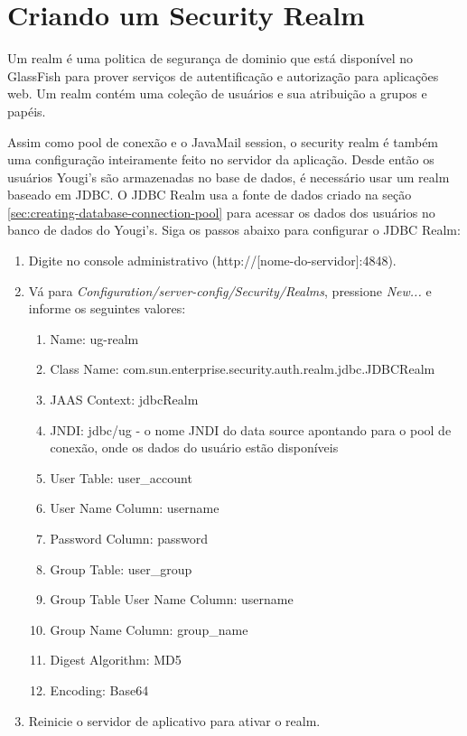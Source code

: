 \documentclass[envcountsame,envcountchap,letterpaper]{svmono}
\begin{document}
\section{Criando um Security Realm}

Um realm é uma politica de segurança de dominio que está disponível no GlassFish para prover serviços de autentificação e autorização para aplicações web. Um realm contém uma coleção de usuários e sua atribuição a grupos e papéis.

Assim como pool de conexão e o JavaMail session, o security realm é também uma configuração inteiramente feito no servidor da aplicação. Desde então os usuários Yougi's são armazenadas no base de dados, é necessário usar um realm baseado em JDBC. O JDBC Realm usa a fonte de dados criado na seção \ref{sec:creating-database-connection-pool} para acessar os dados dos usuários no banco de dados do Yougi's. Siga os passos abaixo para configurar o JDBC Realm:

\begin{enumerate}
\item Digite no console administrativo (http://[nome-do-servidor]:4848).
\item Vá para \textit{Configuration/server-config/Security/Realms}, pressione \textit{New...} e informe os seguintes valores:
   \begin{enumerate}
   \item Name: ug-realm
   \item Class Name: com.sun.enterprise.security.auth.realm.jdbc.JDBCRealm
   \item JAAS Context: jdbcRealm
   \item JNDI: jdbc/ug - o nome JNDI do data source apontando para o pool de conexão, onde os dados do usuário estão disponíveis
   \item User Table: user\_account
   \item User Name Column: username
   \item Password Column: password
   \item Group Table: user\_group
   \item Group Table User Name Column: username
   \item Group Name Column: group\_name
   \item Digest Algorithm: MD5
   \item Encoding: Base64
   \end{enumerate}
\item Reinicie o servidor de aplicativo para ativar o realm.
\end{enumerate}
\end{document}
